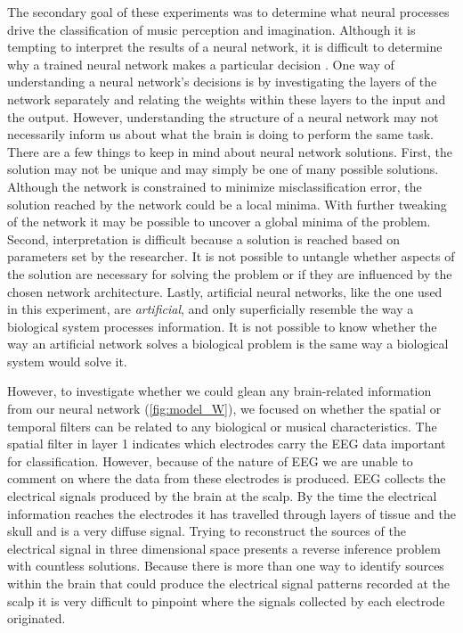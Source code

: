 The secondary goal of these experiments was to determine what neural processes drive the classification of music perception and imagination.
Although it is tempting to interpret the results of a neural network, it is difficult to determine why a trained neural network makes a particular decision \cite{towell_1992_interpretation}.
One way of understanding a neural network's decisions is by investigating the layers of the network separately and relating the weights within these layers to the input and the output. 
However, understanding the structure of a neural network may not necessarily inform us about what the brain is doing to perform the same task. 
There are a few things to keep in mind about neural network solutions. 
First, the solution may not be unique and may simply be one of many possible solutions. 
Although the network is constrained to minimize misclassification error, the solution reached by the network could be a local minima. 
With further tweaking of the network it may be possible to uncover a global minima of the problem. 
Second, interpretation is difficult because a solution is reached based on parameters set by the researcher. 
It is not possible to untangle whether aspects of the solution are necessary for solving the problem or if they are influenced by the chosen network architecture. 
Lastly, artificial neural networks, like the one used in this experiment, are \emph{artificial}, and only superficially resemble the way a biological system processes information. 
It is not possible to know whether the way an artificial network solves a biological problem is the same way a biological system would solve it. 

However, to investigate whether we could glean any brain-related information from our neural network (\autoref{fig:model_W}), we focused on whether the spatial or temporal filters can be related to any biological or musical characteristics.
The spatial filter in layer 1 indicates which electrodes carry the \ac{EEG} data important for classification. 
However, because of the nature of \ac{EEG} we are unable to comment on where the data from these electrodes is produced.
\ac{EEG} collects the electrical signals produced by the brain at the scalp. 
By the time the electrical information reaches the electrodes it has travelled through layers of tissue and the skull and is a very diffuse signal. 
Trying to reconstruct the sources of the electrical signal in three dimensional space presents a reverse inference problem with countless solutions.
Because there is more than one way to identify sources within the brain that could produce the electrical signal patterns recorded at the scalp it is very difficult to pinpoint where the signals collected by each electrode originated.

